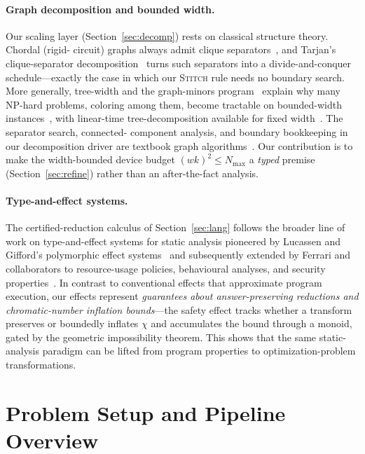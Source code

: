 \documentclass[11pt]{article}
\theoremstyle{definition}
\theoremstyle{remark}
\newcommand{\Nmax}{N_{\max}}
\newcommand{\rn}[1]{\textsc{\footnotesize #1}}
\begin{document}
\paragraph{Graph decomposition and bounded width.} Our scaling layer
(Section~\ref{sec:decomp}) rests on classical structure theory. Chordal (rigid-
circuit) graphs always admit clique separators~\cite{Dirac1961}, and Tarjan's
clique-separator decomposition~\cite{Tarjan1985} turns such separators into a
divide-and-conquer schedule---exactly the case in which our \rn{Stitch} rule needs
no boundary search. More generally, tree-width and the graph-minors
program~\cite{RobertsonSeymour1986} explain why many NP-hard problems, coloring
among them, become tractable on bounded-width
instances~\cite{ArnborgProskurowski1989}, with linear-time tree-decomposition
available for fixed width~\cite{Bodlaender1996}. The separator search, connected-
component analysis, and boundary bookkeeping in our decomposition driver are
textbook graph algorithms~\cite{Cormen2009}. Our contribution is to make the
width-bounded device budget $(wk)^2\le\Nmax$ a \emph{typed} premise
(Section~\ref{sec:refine}) rather than an after-the-fact analysis.

\paragraph{Type-and-effect systems.} The certified-reduction calculus of
Section~\ref{sec:lang} follows the broader line of work on type-and-effect systems
for static analysis pioneered by Lucassen and Gifford's polymorphic effect
systems~\cite{LucassenGifford1988} and subsequently extended by Ferrari and
collaborators to resource-usage policies, behavioural analyses, and security
properties~\cite{BodeiDeganoFerrari1998,BartolettiDeganoFerrariZunino2009,DeganoFerrariGalletta2016}.
In contrast to conventional effects that approximate program execution, our effects
represent \emph{guarantees about answer-preserving reductions and chromatic-number
inflation bounds}---the safety effect tracks whether a transform preserves or
boundedly inflates $\chi$ and accumulates the bound through a monoid, gated by the
geometric impossibility theorem. This shows that the same static-analysis paradigm
can be lifted from program properties to optimization-problem transformations.

\section{Problem Setup and Pipeline Overview}
\label{sec:overview}
\end{document}
